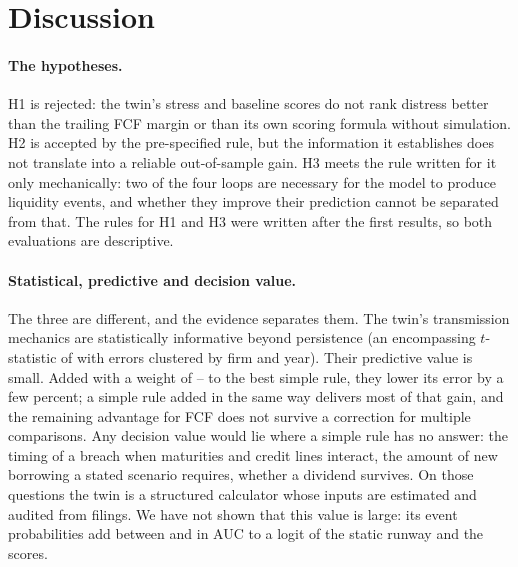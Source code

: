 \documentclass[11pt]{article}
\begin{document}
\begin{table}[t]
\centering\footnotesize
\caption{Sensitivity to assumed parameters}
\label{tab:sens}

\end{table}

\section{Discussion}\label{sec:discussion}

\paragraph{The hypotheses.} H1 is rejected: the twin's stress and baseline scores do not rank distress better than the trailing FCF margin or than its own scoring formula without simulation. H2 is accepted by the pre-specified rule, but the information it establishes does not translate into a reliable out-of-sample gain. H3 meets the rule written for it only mechanically: two of the four loops are necessary for the model to produce liquidity events, and whether they improve their prediction cannot be separated from that. The rules for H1 and H3 were written after the first results, so both evaluations are descriptive.

\paragraph{Statistical, predictive and decision value.} The three are different, and the evidence separates them. The twin's transmission mechanics are statistically informative beyond persistence (an encompassing $t$-statistic of \TrEncTwinTTwoWay{} with errors clustered by firm and year). Their predictive value is small. Added with a weight of \TrLambdaLo--\TrLambdaHi{} to the best simple rule, they lower its error by a few percent; a simple rule added in the same way delivers most of that gain, and the remaining advantage for FCF does not survive a correction for multiple comparisons. Any decision value would lie where a simple rule has no answer: the timing of a breach when maturities and credit lines interact, the amount of new borrowing a stated scenario requires, whether a dividend survives. On those questions the twin is a structured calculator whose inputs are estimated and audited from filings. We have not shown that this value is large: its event probabilities add between \DecDivDelta{} and \DecCapexDelta{} in AUC to a logit of the static runway and the scores.
\end{document}
